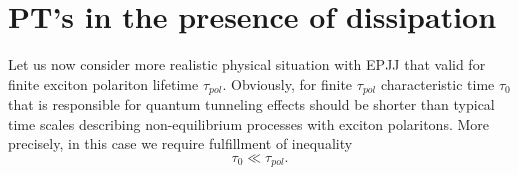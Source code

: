 \documentclass[aps, pre, preprint, groupedaddress, superscriptaddress, showkeys, showpacs] {revtex4-1}
\begin{document}
%
%
%
%
\section{PT's in the presence of dissipation 
\label{sec:non-equilibrium}}

Let us now consider more realistic physical situation with EPJJ that valid for finite exciton polariton lifetime $\tau_{pol}$. Obviously, for finite $\tau_{pol}$  characteristic time $\tau_0$ that is responsible for quantum tunneling effects  should be shorter than typical time scales describing non-equilibrium processes with exciton polaritons. More precisely, in this case we require fulfillment of  inequality 
 \begin{equation}
 \tau_{0}\ll\tau_{pol}.
 \label{eq:lifetime}  
\end{equation}
\end{document}
